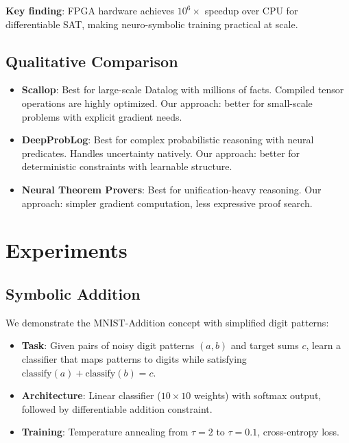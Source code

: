 \documentclass[11pt,a4paper]{article}
\begin{document}
\textbf{Key finding}: FPGA hardware achieves $10^6\times$ speedup over CPU for
differentiable SAT, making neuro-symbolic training practical at scale.

\subsection{Qualitative Comparison}
\label{subsec:qualitative_chirho}

\begin{itemize}
  \item \textbf{Scallop}: Best for large-scale Datalog with millions of facts.
  Compiled tensor operations are highly optimized.
  Our approach: better for small-scale problems with explicit gradient needs.

  \item \textbf{DeepProbLog}: Best for complex probabilistic reasoning with neural predicates.
  Handles uncertainty natively.
  Our approach: better for deterministic constraints with learnable structure.

  \item \textbf{Neural Theorem Provers}: Best for unification-heavy reasoning.
  Our approach: simpler gradient computation, less expressive proof search.
\end{itemize}

\section{Experiments}
\label{sec:experiments_chirho}

\subsection{Symbolic Addition}
\label{subsec:symbolic_addition_chirho}

We demonstrate the MNIST-Addition concept with simplified digit patterns:
\begin{itemize}
  \item \textbf{Task}: Given pairs of noisy digit patterns $(a, b)$ and target sums $c$, learn a classifier that maps patterns to digits while satisfying $\text{classify}(a) + \text{classify}(b) = c$.
  \item \textbf{Architecture}: Linear classifier ($10 \times 10$ weights) with softmax output, followed by differentiable addition constraint.
  \item \textbf{Training}: Temperature annealing from $\tau = 2$ to $\tau = 0.1$, cross-entropy loss.
\end{itemize}
\end{document}
